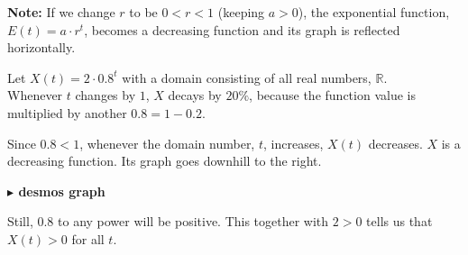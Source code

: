 \documentclass{ximera}
\begin{document}
\textbf{Note:} If we change $r$ to be $0 < r < 1$ (keeping $a>0$), the exponential function, $E(t) = a \cdot r^t$, becomes a decreasing function and its graph is reflected horizontally.







\begin{example}

Let $X(t) = 2 \cdot 0.8^t$ with a domain consisting of all real numbers, $\mathbb{R}$. \\

Whenever $t$ changes by $1$, $X$ decays by $20\%$, because the function value is multiplied by another $0.8 = 1 - 0.2$.



Since $0.8 < 1$, whenever the domain number, $t$, increases, $X(t)$ decreases.  $X$ is a decreasing function.  Its graph goes downhill to the right.









\begin{image}
\end{image}






\begin{onlineOnly}
\textbf{\textcolor{blue!55!black}{$\blacktriangleright$ desmos graph}} 
\begin{center}
\end{center}
\end{onlineOnly}




Still, $0.8$ to any power will be positive.  This together with $2>0$ tells us that $X(t) > 0$ for all $t$.


\end{example}
\end{document}
